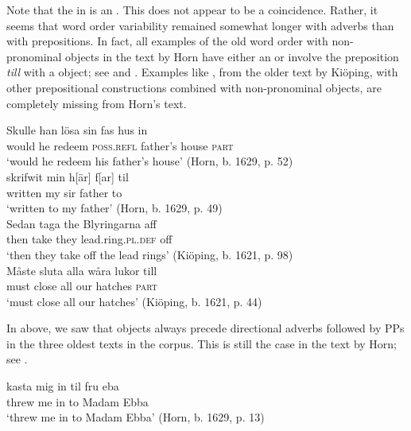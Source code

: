 \documentclass[output=paper]{langscibook}
\begin{document}
Note that the  in  is an . This does not appear to be a coincidence. Rather, it seems that word order variability remained somewhat longer with adverbs than with prepositions. In fact, all examples of the old word order with non-pronominal objects in the text by Horn have either an  or involve the preposition \textit{till} with a  object; see  and . Examples like , from the older text by Kiöping, with other prepositional constructions combined with non-pronominal objects, are completely missing from Horn’s text.


\ea\label{ex:lalu:40}
\ea\label{ex:lalu:40a}
\gll  Skulle  han   lösa     sin         fas       hus in\\
    would  he   redeem   \textsc{poss.refl}   father’s   house   \textsc{part}\\
\glt `would he redeem his father’s house’ (Horn, b. 1629, p. 52)\\

\ex\label{ex:lalu:40b}
\gll  skrifwit   min   h[är] f[ar] til\\
    written   my   sir   father   to \\
\glt `written to my father’ (Horn, b. 1629, p. 49)\\
\z
\ex\label{ex:lalu:41}
\ea
\gll  Sedan   taga   the     Blyringarna     aff\\
    then     take   they   lead.ring.\textsc{pl.def}   off\\
\glt `then they take off the lead rings’ (Kiöping, b. 1621, p. 98)\\

\ex
\gll  Måste   sluta     alla   wåra   lukor     till \\
    must     close     all   our   hatches   \textsc{part}\\
\glt `must close all our hatches’ (Kiöping, b. 1621, p. 44)\\
\z
\z


In  above, we saw that objects always precede directional adverbs followed by PPs in the three oldest texts in the corpus. This is still the case in the text by Horn; see .


\ea\label{ex:lalu:42}
\gll  kasta     mig   in     til     fru     eba\\
threw       me   in     to     Madam   Ebba\\
\glt `threw me in to Madam Ebba’ (Horn, b. 1629, p. 13)\\
\z
\end{document}
